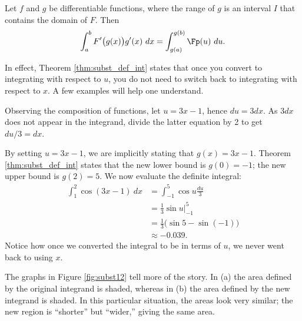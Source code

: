 {Let $f$ and $g$ be differentiable functions, where the range of $g$ is an interval $I$ that contains the domain of $F$. Then 
$$\int_a^b F'\big(g(x)\big)g'(x)\ dx = \int_{g(a)}^{g(b)} \Fp(u)\ du.$$
}

In effect, Theorem \ref{thm:subst_def_int} states that once you convert to integrating with respect to $u$, you do not need to switch back to integrating with respect to $x$. A few examples will help one understand.\\

{Observing the composition of functions, let $u=3x-1$, hence $du = 3dx$. As $3dx$ does not appear in the integrand, divide the latter equation by 2 to get $du/3 = dx$. 

By setting $u = 3x-1$, we are implicitly stating that $g(x) = 3x-1$. Theorem \ref{thm:subst_def_int} states that the new lower bound is $g(0) = -1$; the new upper bound is $g(2) = 5$. We now evaluate the definite integral:
\begin{align*}
\int_1^2 \cos(3x-1) \ dx &=	\int_{-1}^5 \cos u \frac{du}{3} \\
								&= \frac{1}{3} \sin u\Big|_{-1}^5 \\
								&= \frac{1}{3}\big(\sin 5- \sin (-1)\big)\\
								&\approx -0.039.
\end{align*}
Notice how once we converted the integral to be in terms of $u$, we never went back to using $x$.

{%
}%
{%
}%

The graphs in Figure \ref{fig:subst12} tell more of the story. In (a) the area defined by the original integrand is shaded, whereas in (b) the area defined by the new integrand is shaded. In this particular situation, the areas look very similar; the new region is ``shorter'' but ``wider,'' giving the same area.
}\\

